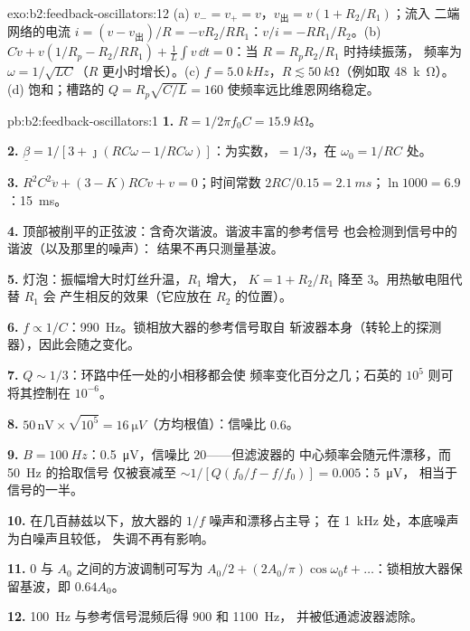 \begin{solution}{exo:b2:feedback-oscillators:12}
(a) $v_- = v_+ = v$，$v_{\text{出}} = v(1 + R_2/R_1)$；流入
二端网络的电流 $i = (v - v_{\text{出}})/R = -vR_2/RR_1$：$v/i = -RR_1/R_2$。(b) $C\dot v +
v(1/R_p - R_2/RR_1) + \frac1L\int v\,\dd t = 0$：当 $R = R_pR_2/R_1$ 时持续振荡，
频率为 $\omega = 1/\sqrt{LC}$（$R$ 更小时增长）。(c) $f = \qty{5.0}{kHz}$，$R \lesssim
\qty{50}{k\ohm}$（例如取 \qty{48}{k\ohm}）。(d) 饱和；槽路的 $Q = R_p
\sqrt{C/L} = 160$ 使频率远比维恩网络稳定。
\end{solution}

\begin{solution}{pb:b2:feedback-oscillators:1}
\textbf{1.} $R = 1/2\pi f_0C = \qty{15.9}{k\ohm}$。

\textbf{2.} $\underline\beta = 1/[3 + \jmath(RC\omega - 1/RC\omega)]$：为实数，$= 1/3$，在
$\omega_0 = 1/RC$ 处。

\textbf{3.} $R^2C^2\ddot v + (3 - K)RC\dot v + v = 0$；时间常数 $2RC/0.15 =
\qty{2.1}{ms}$；$\ln1000 = 6.9$：\qty{15}{ms}。

\textbf{4.} 顶部被削平的正弦波：含奇次谐波。谐波丰富的参考信号
也会检测到信号中的谐波（以及那里的噪声）：
结果不再只测量基波。

\textbf{5.} 灯泡：振幅增大时灯丝升温，$R_1$ 增大，
$K = 1 + R_2/R_1$ 降至 $3$。用热敏电阻代替 $R_1$ 会
产生相反的效果（它应放在 $R_2$ 的位置）。

\textbf{6.} $f \propto 1/C$：\qty{990}{Hz}。锁相放大器的参考信号取自
斩波器本身（转轮上的探测器），因此会随之变化。

\textbf{7.} $Q \sim 1/3$：环路中任一处的小相移都会使
频率变化百分之几；石英的 $10^5$ 则可将其控制在 $10^{-6}$。

\textbf{8.} $50\,\text{nV} \times \sqrt{10^5} = \qty{16}{\micro V}$（方均根值）：信噪比 $0.6$。

\textbf{9.} $B = \qty{100}{Hz}$：\qty{0.5}{\micro V}，信噪比 $20$——但滤波器的
中心频率会随元件漂移，而 \qty{50}{Hz} 的拾取信号
仅被衰减至 $\sim 1/[Q(f_0/f - f/f_0)] = 0.005$：\qty{5}{\micro V}，
相当于信号的一半。

\textbf{10.} 在几百赫兹以下，放大器的 $1/f$ 噪声和漂移占主导；
在 \qty{1}{kHz} 处，本底噪声为白噪声且较低，
失调不再有影响。

\textbf{11.} $0$ 与 $A_0$ 之间的方波调制可写为 $A_0/2 + (2A_0/\pi)
\cos\omega_0t + \dots$：锁相放大器保留基波，即 $0.64A_0$。

\textbf{12.} \qty{100}{Hz} 与参考信号混频后得 $900$ 和 \qty{1100}{Hz}，
并被低通滤波器滤除。


\end{solution}

